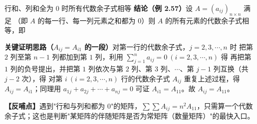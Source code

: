 \begin{fdeep}{行和、列和全为 $0$ 时所有代数余子式相等}
\textbf{结论（例 2.57）}\quad 设 $A=(a_{ij})_{n\times n}$ 满足
（即 $A$ 的每一行、每一列元素之和都为 $0$）则 $A$ 的所有元素的代数余子式相等，即

\textbf{关键证明思路（$A_{ij}=A_{i1}$ 的一段）}\quad 对第一行的代数余子式，$j=2,3,\cdots,n$ 时
把第 $2$ 列至第 $n-1$ 列都加到第 $1$ 列，利用 $\sum\limits_{j=1}^{n}a_{ij}=0\ (i=2,3,\cdots,n)$ 得
再把第 $1$ 列的负号提出，并把第 $1$ 列依次与第 $2$ 列、第 $3$ 列、$\cdots$、第 $j-1$ 列互换（共 $j-2$ 次），得
对第 $i\ (i=2,3,\cdots,n)$ 行的代数余子式 $A_{ij}$ 重复上述过程，得 $A_{ij}=A_{i1}$；同理用 $a_{1j}+a_{2j}+\cdots+a_{nj}=0$ 可证 $A_{i1}=A_{11}$。故 $A_{ij}=A_{11}$。

\textbf{【反哺点】}遇到"行和与列和都为 $0$"的矩阵，$\sum\sum A_{ij}=n^{2}A_{11}$，只需算一个代数余子式；这也是判断"某矩阵的伴随矩阵是否为常矩阵（数量矩阵）"的最快入口。
\end{fdeep}


